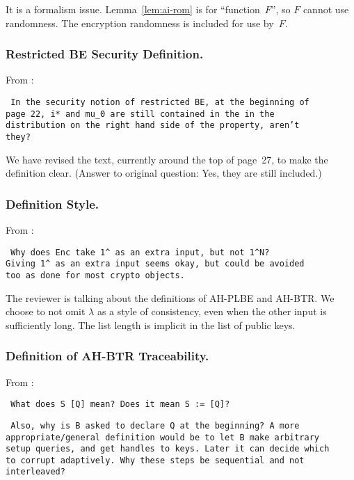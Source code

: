 It is a formalism issue.
Lemma~\ref{lem:ai-rom} is for ``function~$F$'',
so $F$ cannot use randomness.
The encryption randomness is included for use by~$F$.

\subsubsection{Restricted BE Security Definition.}
From :

\texttt{
In the security notion of restricted BE, at the beginning of \\
page 22, i* and mu\_0 are still contained in the {\string\cdots} in the \\
distribution on the right hand side of the {\string\approx} property, aren't \\
they?
}

We have revised the text, currently around the top of page~27,
to make the definition clear.
(Answer to original question: Yes, they are still included.)

\subsubsection{Definition Style.}
From :

\texttt{
Why does Enc take 1\string^{\string\lambda} as an extra input, but not 1\string^N? \\
Giving 1\string^{\string\lambda} as an extra input seems okay, but could be avoided \\
too as done for most crypto objects.
}

The reviewer is talking about the definitions of AH-PLBE and AH-BTR.
We choose to not omit $\lambda$ as a style of consistency,
even when the other input is sufficiently long.
The list length is implicit in the list of public keys.

\subsubsection{Definition of AH-BTR Traceability.}
From :

\texttt{
What does S {\string\leftarrow} [Q] mean? Does it mean S := [Q]?
}

\texttt{
Also, why is B asked to declare Q at the beginning? A more \\
appropriate/general definition would be to let B make arbitrary \\
setup queries, and get handles to keys. Later it can decide which \\
to corrupt adaptively. Why these steps be sequential and not \\
interleaved?
}

